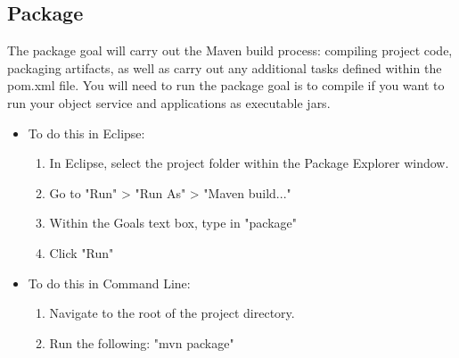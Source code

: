 \documentclass{article}
\begin{document}

\subsection*{Package}
The package goal will carry out the Maven build process: compiling project code, packaging artifacts, as well as carry out any additional tasks defined within the pom.xml file.  You will need to run the package goal is to compile if you want to run your object service and applications as executable jars.
\begin{itemize}
\item To do this in Eclipse:
	\begin{enumerate}
	\item In Eclipse, select the project folder within the Package Explorer window.
	\item Go to "Run" > "Run As" > "Maven build..."
	\item Within the Goals text box, type in "package"
	\item Click "Run" 
	\end{enumerate}
\item To do this in Command Line:
	\begin{enumerate}
	\item Navigate to the root of the project directory.
	\item Run the following: "mvn package"
	\end{enumerate}
\end{itemize}
\end{document}
